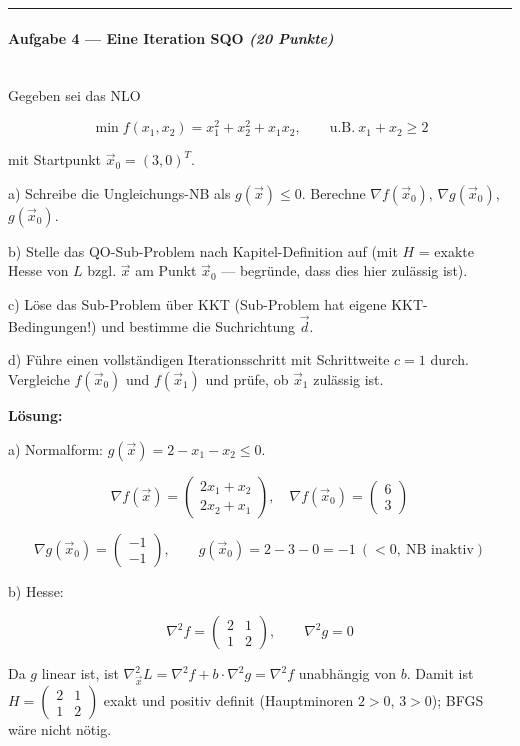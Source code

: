 \documentclass[11pt, a4paper]{article}
\begin{document}
\noindent\textcolor{rulegray}{\rule{\linewidth}{0.4pt}}


\paragraph{Aufgabe 4 — Eine Iteration SQO \textit{(20 Punkte)}}\mbox{}\\[2pt]

Gegeben sei das NLO


\[
\min f(x_1,x_2) = x_1^2 + x_2^2 + x_1 x_2,\qquad \text{u.B.}\ x_1 + x_2 \ge 2
\]


mit Startpunkt $\vec{x}_0 = (3, 0)^T$.


a) Schreibe die Ungleichungs-NB als $g(\vec{x}) \le 0$. Berechne $\nabla f(\vec{x}_0)$, $\nabla g(\vec{x}_0)$, $g(\vec{x}_0)$.

b) Stelle das QO-Sub-Problem nach Kapitel-Definition auf (mit $H$ = exakte Hesse von $L$ bzgl. $\vec{x}$ am Punkt $\vec{x}_0$ — begründe, dass dies hier zulässig ist).

c) Löse das Sub-Problem über KKT (Sub-Problem hat eigene KKT-Bedingungen!) und bestimme die Suchrichtung $\vec{d}$.

d) Führe einen vollständigen Iterationsschritt mit Schrittweite $c=1$ durch. Vergleiche $f(\vec{x}_0)$ und $f(\vec{x}_1)$ und prüfe, ob $\vec{x}_1$ zulässig ist.


\textbf{Lösung:}


a) Normalform: $g(\vec{x}) = 2 - x_1 - x_2 \le 0$.


\[
\nabla f(\vec{x}) = \begin{pmatrix} 2x_1 + x_2 \\ 2x_2 + x_1 \end{pmatrix},\quad \nabla f(\vec{x}_0) = \begin{pmatrix} 6 \\ 3 \end{pmatrix}
\]


\[
\nabla g(\vec{x}_0) = \begin{pmatrix} -1 \\ -1 \end{pmatrix},\qquad g(\vec{x}_0) = 2 - 3 - 0 = -1\ (<0,\ \text{NB inaktiv})
\]


b) Hesse:

\[
\nabla^2 f = \begin{pmatrix} 2 & 1 \\ 1 & 2 \end{pmatrix},\qquad \nabla^2 g = 0
\]

Da $g$ linear ist, ist $\nabla^2_{\vec{x}} L = \nabla^2 f + b\cdot\nabla^2 g = \nabla^2 f$ unabhängig von $b$. Damit ist $H = \begin{pmatrix} 2 & 1 \\ 1 & 2 \end{pmatrix}$ exakt und positiv definit (Hauptminoren $2>0$, $3>0$); BFGS wäre nicht nötig.
\end{document}
